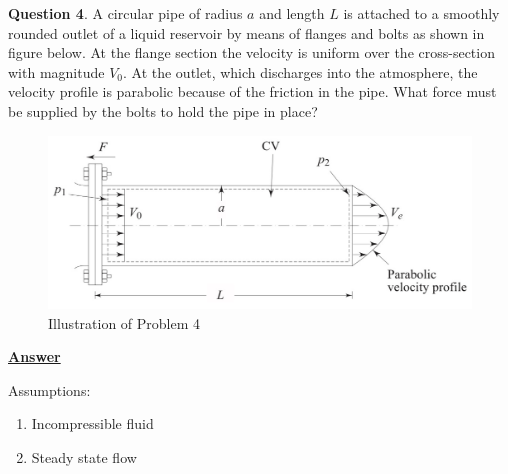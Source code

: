 \documentclass[10pt]{article}
\begin{document}
\break

\textbf{Question 4}. A circular pipe of radius $a$ and length $L$ is attached to a smoothly rounded outlet of a liquid reservoir by means of flanges and bolts as shown in figure below. At the flange section the velocity is uniform over the cross-section with magnitude $V_0$. At the outlet, which discharges into the atmosphere, the velocity profile is parabolic because of the friction in the pipe. What force must be supplied by the bolts to hold the pipe in place?

\begin{figure}[h]
    \centering
    \includegraphics[scale=0.83]{Problem4.jpg}
    \caption{Illustration of Problem 4}
    \label{fig:figprob4}
\end{figure}

\textbf{\underline{Answer}}

Assumptions:
\begin{enumerate}
    \item Incompressible fluid
    \item Steady state flow
\end{enumerate}

\hfill
\end{document}
